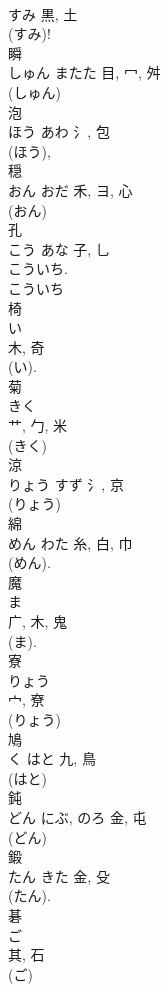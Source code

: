 \documentclass[8pt]{extreport}
\begin{document}
\begin{CJK}{UTF8}{min}
\\	すみ	黒, 土	
\\	(すみ)!
\\	瞬	
\\	しゅん	またた	目, 冖, 舛		
\\	(しゅん) 
\\	泡	
\\	ほう	あわ	氵, 包	
\\	(ほう), 
\\	穏	
\\	おん	おだ	禾, ヨ, 心		
\\	(おん) 
\\	孔	
\\	こう	あな	子, 乚	
\\	こういち.
\\	こういち 
\\	椅	
\\	い	
\\	木, 奇	
\\	(い). 
\\	菊	
\\	きく	
\\	艹, 勹, 米	
\\	(きく) 
\\	涼	
\\	りょう	すず	氵, 京	
\\	(りょう) 
\\	綿	
\\	めん	わた	糸, 白, 巾	
\\	(めん).	
\\	魔	
\\	ま	
\\	广, 木, 鬼	
\\	(ま).	
\\	寮	
\\	りょう	
\\	宀, 尞	
\\	(りょう) 
\\	鳩	
\\	く	はと	九, 鳥	
\\	(はと) 
\\	鈍	
\\	どん	にぶ, のろ	金, 屯	
\\	(どん) 
\\	鍛	
\\	たん	きた	金, 殳		
\\	(たん).	
\\	碁	
\\	ご	
\\	其, 石	
\\	(ご) 

\end{CJK}
\end{document}

